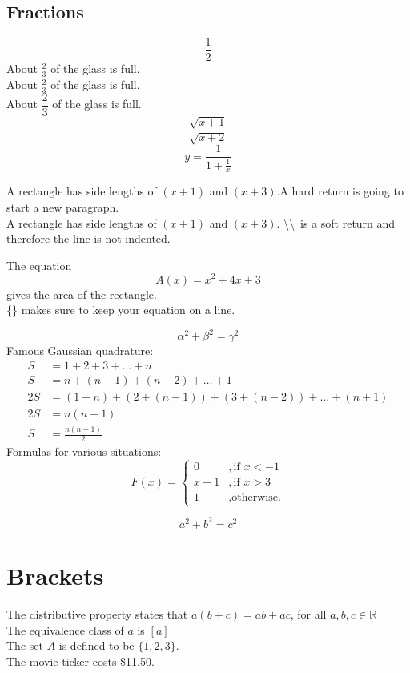 \documentclass[12pt]{article}
\begin{document}
\subsection{Fractions}
$$\frac{1}{2}$$
About $\displaystyle \frac{2}{3}$ of the glass is full.\\[12pt]
About $\frac{2}{3}$ of the glass is full.\\[6pt]
About $\dfrac{2}{3}$ of the glass is full.
$$\frac{\sqrt{x+1}}{\sqrt{x+2}}$$
$$y=\frac{1}{  1+\frac{1}{x}  }$$

A rectangle has side lengths of $(x+1)$ and $(x+3)$.A hard return is going to start a new paragraph.\\
A rectangle has side lengths of $(x+1)$ and $(x+3)$. \textbackslash\textbackslash\ is a soft return and therefore the line is not indented.

The equation $${A(x)=x^2+4x+3}$$ gives the area of the rectangle.\\
\{\} makes sure to keep your equation on a line.\cite{trevisanato2000tea}

\begin{equation}\label{eq0}
    \alpha^2+\beta^2=\gamma^2
\end{equation}
Famous Gaussian quadrature:
\begin{equation}
    \begin{split}
        S&=1+2+3+\dots+n\\
        S&=n+(n-1)+(n-2)+\dots+1\\
        2S&=(1+n)+(2+(n-1))+(3+(n-2))+\dots+(n+1)\\
        2S&=n(n+1)\\
        S&=\frac{n(n+1)}{2} 
    \end{split}
\end{equation}
Formulas for various situations:
\begin{equation}
    F(x)=
    \begin{cases}
        0&,\text{if $x<-1$}\\
        x+1&,\text{if $x>3$}\\
        1&,\text{otherwise.}
    \end{cases}
\end{equation}

\[
    a^2+b^2=c^2
\]

\section{Brackets}

The distributive property states that $a(b+c)
=ab+ac$, for all $a,b,c\in \mathbb{R}$\\[6pt]
The equivalence class of $a$ is $[a]$\\[6pt]
The set $A$ is defined to be $\{1,2,3\}$.\\[6pt]
The movie ticker costs \$11.50.\\[6pt]  
\end{document}
